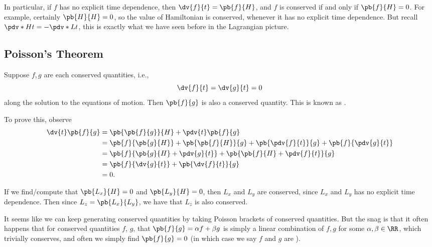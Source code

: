 In particular, if \(f\) has no explicit time dependence, then \(\dv{f}{t} = \pb{f}{H}\), and \(f\) is conserved if and only if \(\pb{f}{H} = 0\). For example, certainly \(\pb{H}{H} = 0\), so the value of Hamiltonian is conserved, whenever it has no explicit time dependence. But recall \(\pdv*{H}{t} = - \pdv*{L}{t}\), this is exactly what we have seen before in the Lagrangian picture.

\subsection{Poisson's Theorem}

Suppose \(f, g\) are each conserved quantities, i.e.,
\begin{equation}
    \dv{f}{t} = \dv{g}{t} = 0
\end{equation}
along the solution to the equations of motion. Then \(\pb{f}{g}\) is also a conserved quantity. This is known as .

To prove this, observe
\begin{subequations}
    \begin{align}
        \dv{t} \pb{f}{g} &= \pb{\pb{f}{g}}{H} + \pdv{t} \pb{f}{g} \\
        &= \pb{f}{\pb{g}{H}} + \pb{\pb{f}{H}}{g} + \pb{\pdv{f}{t}}{g} + \pb{f}{\pdv{g}{t}} \\
        &= \pb{f}{\pb{g}{H} + \pdv{g}{t}} + \pb{\pb{f}{H} + \pdv{f}{t}}{g} \\
        &= \pb{f}{\dv{g}{t}} + \pb{\dv{f}{t}}{g} \\
        &= 0.
    \end{align}
\end{subequations}

\begin{example}
    If we find/compute that \(\pb{L_x}{H} = 0\) and \(\pb{L_y}{H} = 0\), then \(L_x\) and \(L_y\) are conserved, since \(L_x\) and \(L_y\) has no explicit time dependence. Then since \(L_z = \pb{L_x}{L_y}\), we have that \(L_z\) is also conserved.
\end{example}

It seems like we can keep generating conserved quantities by taking Poisson brackets of conserved quantities. But the snag is that it often happens that for conserved quantities \(f\), \(g\), that \(\pb{f}{g} = \alpha f + \beta g\) is simply a linear combination of \(f, g\) for some \(\alpha, \beta \in \RR\), which trivially conserves, and often we simply find \(\pb{f}{g} = 0\) (in which case we say \(f\) and \(g\) are ).

